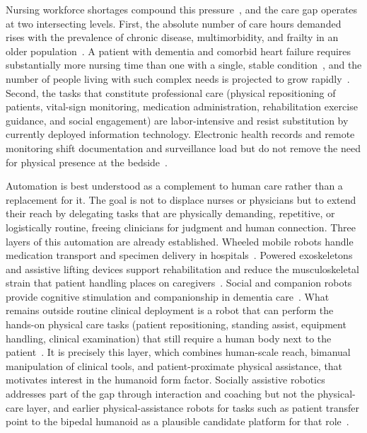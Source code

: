 \documentclass[acmsmall]{acmart}
\begin{document}
Nursing workforce shortages compound this pressure~\cite{lasater2021,aiken2014nurse},
and the care gap operates at two intersecting levels. First, the absolute number
of care hours demanded rises with the prevalence of chronic disease,
multimorbidity, and frailty in an older
population~\cite{barnett2012epidemiology,clegg2013frailty}. A patient with
dementia and comorbid heart failure requires substantially more nursing time
than one with a single, stable
condition~\cite{gopfert2021primary,arling2003cognitive,moth2012chronic}, and the
number of people living with such complex needs is projected to grow
rapidly~\cite{kingston2018projections,prince2015burden,chowdhury2023global}.
Second, the tasks that constitute professional care (physical repositioning of
patients, vital-sign monitoring, medication administration, rehabilitation
exercise guidance, and social engagement) are labor-intensive and resist
substitution by currently deployed information technology. Electronic health
records and remote monitoring shift documentation and surveillance load but do
not remove the need for physical presence at the
bedside~\cite{sinsky2016allocation,sun2020nurses,koehler2018efficacy}.

Automation is best understood as a complement to human care rather than a
replacement for it. The goal is not to displace nurses or physicians but to
extend their reach by delegating tasks that are physically demanding, repetitive,
or logistically routine, freeing clinicians for judgment and human connection.
Three layers of this automation are already established. Wheeled mobile robots
handle medication transport and specimen delivery in
hospitals~\cite{bloss2011mobile,ozkil2009service,fragapane2021autonomous}.
Powered exoskeletons and assistive lifting devices support rehabilitation and
reduce the musculoskeletal strain that patient handling places on
caregivers~\cite{nelson2006evidence,theurel2019occupational,mehrholz2017electromechanical}.
Social and companion robots provide cognitive stimulation and companionship in
dementia care~\cite{pu2019effectiveness,mordoch2013social,wada2007living}. What
remains outside routine clinical deployment is a robot that can perform the
hands-on physical care tasks (patient repositioning, standing assist, equipment
handling, clinical examination) that still require a human body next to the
patient~\cite{sorensen2025humanoid}. It is precisely this layer, which combines
human-scale reach, bimanual manipulation of clinical tools, and
patient-proximate physical assistance, that motivates interest in the humanoid
form factor. Socially assistive robotics~\cite{feilseifer2005defining,riek2017healthcare}
addresses part of the gap through interaction and coaching but not the
physical-care layer, and earlier physical-assistance robots for tasks such as
patient transfer point to the bipedal humanoid as a plausible candidate platform
for that role~\cite{mukai2010riba,ding2014rona,desantis2008atlas}.
\end{document}

